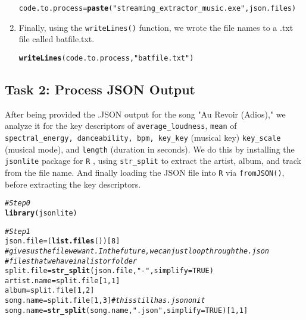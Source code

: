 \documentclass{article}\usepackage[]{graphicx}\usepackage[]{xcolor}
\makeatletter
\newcommand{\hlnum}[1]{\textcolor[rgb]{0.686,0.059,0.569}{#1}}%
\newcommand{\hlsng}[1]{\textcolor[rgb]{0.192,0.494,0.8}{#1}}%
\newcommand{\hlcom}[1]{\textcolor[rgb]{0.678,0.584,0.686}{\textit{#1}}}%
\newcommand{\hldef}[1]{\textcolor[rgb]{0.345,0.345,0.345}{#1}}%
\newcommand{\hlkwb}[1]{\textcolor[rgb]{0.69,0.353,0.396}{#1}}%
\newcommand{\hlkwc}[1]{\textcolor[rgb]{0.333,0.667,0.333}{#1}}%
\newcommand{\hlkwd}[1]{\textcolor[rgb]{0.737,0.353,0.396}{\textbf{#1}}}%
\newenvironment{kframe}{%
 \def\at@end@of@kframe{}%
 \ifinner\ifhmode%
  \def\at@end@of@kframe{\end{minipage}}%
  \begin{minipage}{\columnwidth}%
 \fi\fi%
 \def\FrameCommand##1{\hskip\@totalleftmargin \hskip-\fboxsep
 \colorbox{shadecolor}{##1}\hskip-\fboxsep
     \hskip-\linewidth \hskip-\@totalleftmargin \hskip\columnwidth}%
 \MakeFramed {\advance\hsize-\width
   \@totalleftmargin\z@ \linewidth\hsize
   \@setminipage}}%
 {\par\unskip\endMakeFramed%
 \at@end@of@kframe}
\newenvironment{knitrout}{}{} %
\makeatother
\begin{document}
\begin{multicols}{2}
\begin{enumerate}[1.]
\begin{knitrout}
\begin{kframe}
\begin{alltt}
\hldef{code.to.process} \hlkwb{=} \hlkwd{paste}\hldef{(}\hlsng{"streaming_extractor_music.exe "}\hldef{, json.files)}
\end{alltt}
\end{kframe}
\end{knitrout}

\item Finally, using the \texttt{writeLines()} function, we wrote the file names to a .txt file called batfile.txt.

\begin{knitrout}\scriptsize
{}\color{fgcolor}\begin{kframe}
\begin{alltt}
\hlkwd{writeLines}\hldef{(code.to.process,} \hlsng{"batfile.txt"}\hldef{)}
\end{alltt}
\end{kframe}
\end{knitrout}
\end{enumerate}

\subsection{Task 2: Process JSON Output}
After being provided the .JSON output for the song "Au Revoir (Adios)," we analyze it for the key descriptors of \texttt{average\_loudness}, \texttt{mean} of \texttt{spectral\_energy, danceability, bpm, key\_key} (musical key) \texttt{key\_scale} (musical mode), and \texttt{length} (duration in seconds). We do this by installing the \texttt{jsonlite} package for \texttt{R} \citep{jsonlite}, using \texttt{str\_split} to extract the artist, album, and track from the file name. And finally loading the JSON file into \texttt{R} via \texttt{fromJSON()}, before extracting the key descriptors.
\begin{knitrout}\scriptsize
{}\color{fgcolor}\begin{kframe}
\begin{alltt}
\hlcom{#Step 0}
\hlkwd{library}\hldef{(jsonlite)}

\hlcom{#Step 1}
\hldef{json.file} \hlkwb{=} \hldef{(}\hlkwd{list.files}\hldef{())[}\hlnum{8}\hldef{]}
\hlcom{#gives us the file we want. In the future, we can just loop through the .json}
\hlcom{#files that we have in a list or folder}
\hldef{split.file} \hlkwb{=} \hlkwd{str_split}\hldef{(json.file,} \hlsng{"-"}\hldef{,} \hlkwc{simplify} \hldef{=} \hlnum{TRUE}\hldef{)}
\hldef{artist.name} \hlkwb{=} \hldef{split.file[}\hlnum{1}\hldef{,} \hlnum{1}\hldef{]}
\hldef{album} \hlkwb{=} \hldef{split.file[}\hlnum{1}\hldef{,} \hlnum{2}\hldef{]}
\hldef{song.name} \hlkwb{=} \hldef{split.file[}\hlnum{1}\hldef{,} \hlnum{3}\hldef{]} \hlcom{#this still has .json on it}
\hldef{song.name} \hlkwb{=} \hlkwd{str_split}\hldef{(song.name,} \hlsng{".json"}\hldef{,} \hlkwc{simplify} \hldef{=} \hlnum{TRUE}\hldef{)[}\hlnum{1}\hldef{,}\hlnum{1}\hldef{]}


\end{alltt}
\end{kframe}
\end{knitrout}
\end{multicols}
\end{document}

